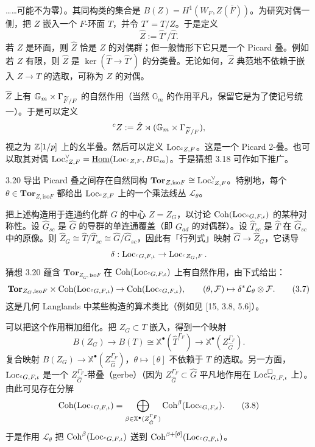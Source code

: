 ……可能不为零）。其同构类的集合是 $B(Z)=H^{1}(W_F,Z(\overline F))$。为研究对偶一侧，把 $Z$ 嵌入一个 $F$-环面 $T$，并令 $T'=T/Z$。于是定义
\[
\hat Z := \hat T'/\hat T.
\]
若 $Z$ 是环面，则 $\hat Z$ 恰是 $Z$ 的对偶群；但一般情形下它只是一个 Picard 叠。例如若 $Z$ 有限，则 $\hat Z$ 是 $\ker(\hat T\to\hat T')$ 的分类叠。无论如何，$\hat Z$ 典范地不依赖于嵌入 $Z\to T$ 的选取，可称为 $Z$ 的对偶。

$\hat Z$ 上有 $\mathbb G_m\times\Gamma_{\widetilde F/F}$ 的自然作用（当然 $\mathbb G_m$ 的作用平凡，保留它是为了使记号统一）。于是可以定义
\[
{}^{c}Z := \hat Z\rtimes(\mathbb G_m\times\Gamma_{\widetilde F/F}),
\]
视之为 $\mathbb{Z}[1/p]$ 上的幺半叠。然后可以定义 $\operatorname{Loc}_{{}^{c}Z,F}$。这是一个 Picard 2-叠。也可以取其对偶 $\operatorname{Loc}^{\vee}_{{}^{c}Z,F}=\underline{\operatorname{Hom}}(\operatorname{Loc}_{{}^{c}Z,F},B\mathbb G_m)$。于是猜想 3.18 可作如下推广。
\begin{conj}{3.20}
导出 Picard 叠之间存在自然同构 $\mathbf{Tor}_{Z,\mathrm{iso}F}\cong\operatorname{Loc}^{\vee}_{{}^{c}Z,F}$。特别地，每个 $\theta\in\mathbf{Tor}_{Z,\mathrm{iso}F}$ 都给出 $\operatorname{Loc}_{{}^{c}Z,F}$ 上的一个乘法线丛 $\mathcal L_{\theta}$。
\end{conj}

把上述构造用于连通约化群 $G$ 的中心 $Z=Z_G$，以讨论 $\operatorname{Coh}(\operatorname{Loc}_{{}^{c}G,F,\iota})$ 的某种对称性。设 $\hat G_{sc}$ 是 $\hat G$ 的导群的单连通覆盖（即 $G_{ad}$ 的对偶群）。设 $\hat T_{sc}$ 是 $\hat T$ 在 $\hat G_{sc}$ 中的原像。则 $\hat Z_G\cong\hat T/\hat T_{sc}\cong\hat G/\hat G_{sc}$，因此有「行列式」映射 $\hat G\to\hat Z_G$，它诱导
\[
\delta:\operatorname{Loc}_{{}^{c}G,F,\iota}\to\operatorname{Loc}_{{}^{c}Z_G,F}.
\]
猜想 3.20 蕴含 $\mathbf{Tor}_{Z_G,\mathrm{iso}F}$ 在 $\operatorname{Coh}(\operatorname{Loc}_{{}^{c}G,F,\iota})$ 上有自然作用，由下式给出：
\begin{equation}
\mathbf{Tor}_{Z_G,\mathrm{iso}F}\times\operatorname{Coh}(\operatorname{Loc}_{{}^{c}G,F,\iota})\to\operatorname{Coh}(\operatorname{Loc}_{{}^{c}G,F,\iota}),\qquad (\theta,\mathcal F)\mapsto\delta^{*}\mathcal L_{\theta}\otimes\mathcal F. \tag{3.7}
\end{equation}
这是几何 Langlands 中某些构造的算术类比（例如见 [15, 3.8, 5.6]）。

可以把这个作用稍加细化。把 $Z_G\subset T$ 嵌入，得到一个映射
\[
B(Z_G)\to B(T)\cong\mathbb X^{\bullet}(\hat T^{\Gamma_F})\to\mathbb X^{\bullet}(Z_{\hat G}^{\Gamma_F}).
\]
复合映射 $B(Z_G)\to\mathbb X^{\bullet}(Z_{\hat G}^{\Gamma_F})$，$\theta\mapsto[\theta]$ 不依赖于 $T$ 的选取。另一方面，$\operatorname{Loc}_{{}^{c}G,F,\iota}$ 是一个 $Z_{\hat G}^{\Gamma_F}$-带叠（gerbe）（因为 $Z_{\hat G}^{\Gamma_F}\subset\hat G$ 平凡地作用在 $\operatorname{Loc}^{\square}_{{}^{c}G,F,\iota}$ 上）。由此可见存在分解
\begin{equation}
\operatorname{Coh}(\operatorname{Loc}_{{}^{c}G,F,\iota})=\bigoplus_{\beta\in\mathbb X^{\bullet}(Z_{\hat G}^{\Gamma_F})}\operatorname{Coh}^{\beta}(\operatorname{Loc}_{{}^{c}G,F,\iota}). \tag{3.8}
\end{equation}
于是作用 $\mathcal L_{\theta}$ 把 $\operatorname{Coh}^{\beta}(\operatorname{Loc}_{{}^{c}G,F,\iota})$ 送到 $\operatorname{Coh}^{\beta+[\theta]}(\operatorname{Loc}_{{}^{c}G,F,\iota})$。

